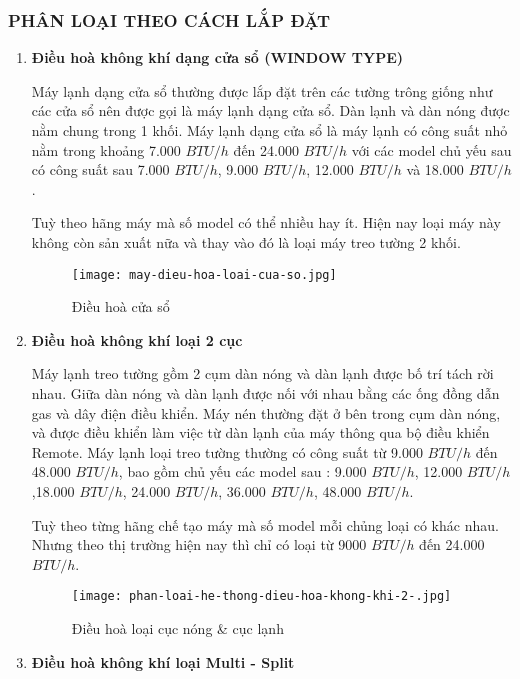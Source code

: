 	\subsubsection{PHÂN LOẠI THEO CÁCH LẮP ĐẶT}
	\begin{enumerate}[leftmargin=0.5cm]
		\item \textbf{Điều hoà không khí dạng cửa sổ (WINDOW TYPE)} 
		
		Máy lạnh dạng cửa sổ thường được lắp đặt trên các tường trông giống như các cửa sổ nên được gọi là máy lạnh dạng cửa sổ. Dàn lạnh và dàn nóng được nằm chung trong 1 khối. Máy lạnh dạng cửa sổ là máy lạnh có công suất nhỏ nằm trong khoảng 7.000 $ BTU/h $ đến 24.000 $ BTU/h $ với các model chủ yếu sau có công suất sau 7.000 $ BTU/h $, 9.000 $ BTU/h $, 12.000 $ BTU/h $ và 18.000 $ BTU/h $. 
		
		Tuỳ theo hãng máy mà số model có thể nhiều hay ít. Hiện nay loại máy này không còn sản xuất nữa và thay vào đó là loại máy treo tường 2 khối.
		
\begin{figure}[H]
	\centering
	\texttt{[image: may-dieu-hoa-loai-cua-so.jpg]}
	\caption{Điều hoà cửa sổ}
\end{figure}
		
		\item \textbf{Điều hoà không khí loại 2 cục}
		
		Máy lạnh treo tường gồm 2 cụm dàn nóng và dàn lạnh được bố trí tách rời nhau. Giữa dàn nóng và dàn lạnh được nối với nhau bằng các ống đồng dẫn gas và dây điện điều khiển. Máy nén thường đặt ở bên trong cụm dàn nóng, và được điều khiển làm việc từ dàn lạnh của máy thông qua bộ điều khiển Remote. Máy lạnh loại treo tường thường có công suất từ 9.000 $ BTU/h $ đến 48.000 $ BTU/h $, bao gồm chủ yếu các model sau : 9.000 $ BTU/h $, 12.000 $ BTU/h $,18.000 $ BTU/h $, 24.000 $ BTU/h $, 36.000 $ BTU/h $, 48.000 $ BTU/h $. 
		
		Tuỳ theo từng hãng chế tạo máy mà số model mỗi chủng loại có khác nhau. Nhưng theo thị trường hiện nay thì chỉ có loại từ 9000 $ BTU/h $ đến 24.000 $ BTU/h $.
		
\begin{figure}[H]
	\centering
	\texttt{[image: phan-loai-he-thong-dieu-hoa-khong-khi-2-.jpg]}
	\caption{Điều hoà loại cục nóng \& cục lạnh}
\end{figure}
		
		\item \textbf{Điều hoà không khí loại Multi - Split}
		

\end{enumerate}
